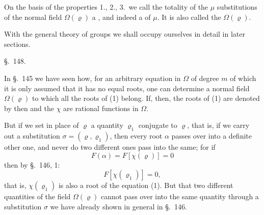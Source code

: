 
On the basis of the properties 1., 2., 3.\ we call the totality of the $\mu$ substitutions of the normal field $\Omega(\varrho)$ a , and indeed a  of  $\mu$. It is also called the  $\Omega(\varrho)$.

With the general theory of groups we shall occupy ourselves in detail in later sections.

\begin{center}
\S.\ 148.
\end{center}

\begin{center}
\end{center}

In \S.\ 145 we have seen how, for an arbitrary equation in $\Omega$ of degree $m$
of which it is only assumed that it has no equal roots, one can determine a normal field $\Omega(\varrho)$ to which all the roots of (1) belong. If, then, the roots of (1) are denoted by
then
and the $\chi$ are rational functions in $\Omega$.

But if we set in place of $\varrho$ a quantity $\varrho_1$ conjugate to $\varrho$, that is, if we carry out a substitution $\sigma = (\varrho, \varrho_1)$, then every root $\alpha$ passes over into a definite other one, and never do two different ones pass into the same; for if
\[
F(\alpha) = F[\chi(\varrho)] = 0
\]
then by \S.\ 146, 1:
\[
F[\chi(\varrho_1)] = 0,
\]
that is, $\chi(\varrho_1)$ is also a root of the equation (1). But that two different quantities of the field $\Omega(\varrho)$ cannot pass over into the same quantity through a substitution $\sigma$ we have already shown in general in \S.\ 146.

